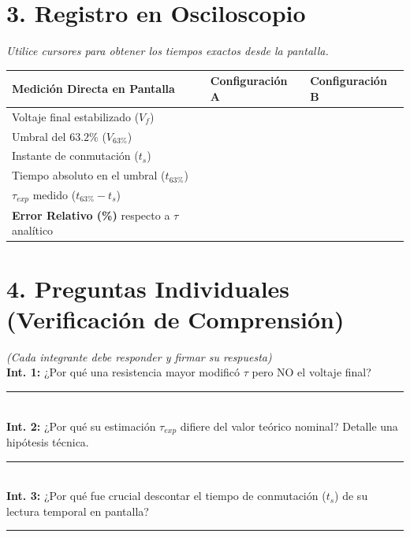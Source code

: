 \documentclass[11pt, a4paper]{article}
\begin{document}
\section*{3. Registro en Osciloscopio}
\textit{Utilice cursores para obtener los tiempos exactos desde la pantalla.}

\renewcommand{\arraystretch}{1.5}
\noindent
\begin{tabularx}{\textwidth}{>{\RaggedRight\arraybackslash}p{5cm} >{\centering\arraybackslash}X >{\centering\arraybackslash}X}
\toprule
\textbf{Medición Directa en Pantalla} & \textbf{Configuración A} & \textbf{Configuración B} \\ 
\midrule
Voltaje final estabilizado ($V_f$) & & \\ \addlinespace
Umbral del $63.2\%$ ($V_{63\%}$) & & \\ \addlinespace
Instante de conmutación ($t_s$) & & \\ \addlinespace
Tiempo absoluto en el umbral ($t_{63\%}$) & & \\ \addlinespace
$\tau_{exp}$ medido ($t_{63\%} - t_s$) & & \\ 
\midrule
\textbf{Error Relativo (\%)} respecto a $\tau$ analítico & & \\
\bottomrule
\end{tabularx}

\vspace{0.4cm}
\section*{4. Preguntas Individuales (Verificación de Comprensión)}
\textit{(Cada integrante debe responder y firmar su respuesta)} \\
\textbf{Int. 1:} ¿Por qué una resistencia mayor modificó $\tau$ pero NO el voltaje final? \\
\rule{\textwidth}{0.4pt} \\
\textbf{Int. 2:} ¿Por qué su estimación $\tau_{exp}$ difiere del valor teórico nominal? Detalle una hipótesis técnica. \\
\rule{\textwidth}{0.4pt} \\
\textbf{Int. 3:} ¿Por qué fue crucial descontar el tiempo de conmutación ($t_s$) de su lectura temporal en pantalla? \\
\rule{\textwidth}{0.4pt} 
\end{document}

